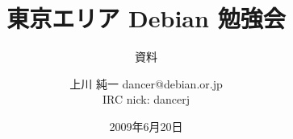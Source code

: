 




\documentclass[cjk,dvipdfmx,12pt]{beamer}
\usepackage{monthlypresentation}



\title{東京エリア Debian 勉強会}
\subtitle{資料}
\author{上川 純一 dancer@debian.or.jp\\IRC nick: dancerj}
\date{2009年6月20日}



